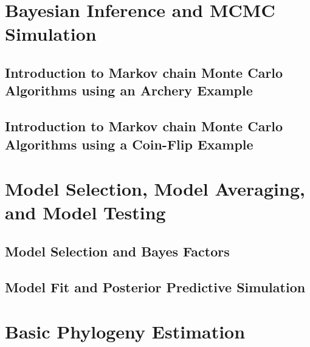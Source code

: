 \documentclass[11pt]{book}
\begin{document}
\part{Bayesian Inference and MCMC Simulation}

\chapter{Introduction to Markov chain Monte Carlo Algorithms using an Archery Example}
\def \ResourcePath {RB_MCMC_Archery_Tutorial/}


\chapter{Introduction to Markov chain Monte Carlo Algorithms using a Coin-Flip Example}
\def \ResourcePath {RB_MCMC_Binomial_Tutorial/}



%

\part{Model Selection, Model Averaging, and Model Testing}

\chapter{Model Selection and Bayes Factors}
\def \ResourcePath {RB_BayesFactor_Tutorial/}


\chapter{Model Fit and Posterior Predictive Simulation}
\def \ResourcePath {RB_BayesFactor_Tutorial/}




\part{Basic Phylogeny Estimation}
\end{document}
